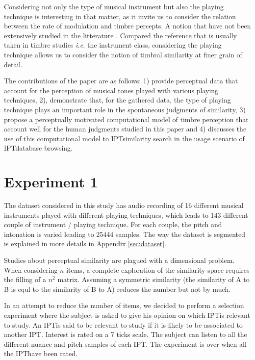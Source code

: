 \documentclass{article}
\newcommand{\ipt}{IPT}
\begin{document}
Considering not only the type of musical instrument but also the playing technique is interesting in that matter, as it invite us to consider the relation between the rate of modulation and timbre percepts. A notion that have not been extensively studied in the litterature \cite{burred2010dynamic}. Compared the reference that is usually taken in timbre studies \textit{i.e.} the instrument class, considering the playing technique allows us to consider the notion of timbral similarity at finer grain of detail.

The contributions of the paper are as follows: 1) provide perceptual data that account for the perception of musical tones played with various playing techniques, 2), demonstrate that, for the gathered data, the type of playing technique plays an important role in the spontaneous judgments of similarity, 3) propose a perceptually motivated computational model of timbre perception that account well for the human judgments studied in this paper and 4) discusses the use of this computational model to \ipt similarity search in the usage scenario of \ipt database browsing.



\section{Experiment 1}\label{sec:xp1}

The dataset considered in this study has audio recording of 16 different musical instruments played with different playing techniques, which leads to 143 different couple of instrument / playing technique. For each couple, the pitch and intonation is varied leading to 25444 samples. The way the dataset is segmented is explained in more details in Appendix \ref{sec:dataset}.

Studies about perceptual similarity are plagued with a dimensional problem. When considering $n$ items, a complete exploration of the similarity space requires the filling of a $n^2$ matrix. Assuming a symmetric similarity (the similarity of A to B is equl to the similarity of B to A) reduces the number but not by much.

In an attempt to reduce the number of items, we decided to perform a selection experiment where the subject is asked to give his opinion on which \ipt is relevant to study. An \ipt is said to be relevant to study if it is likely to be associated to another \ipt. Interest is rated on a 7 ticks scale. The subject can listen to all the different nuance and pitch samples of each \ipt. The experiment is over when all the \ipt have been rated.
\end{document}
